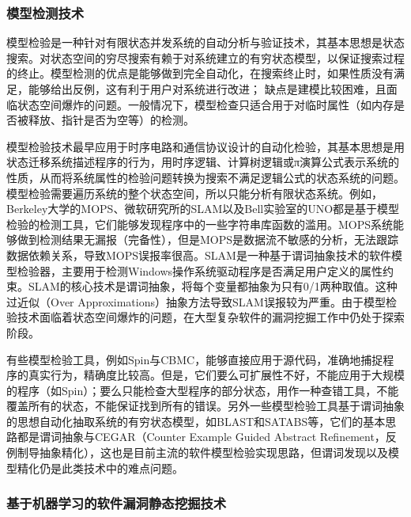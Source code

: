 \subsubsection{模型检测技术}

模型检验是一种针对有限状态并发系统的自动分析与验证技术，其基本思想是状态搜索。对状态空间的穷尽搜索有赖于对系统建立的有穷状态模型，以保证搜索过程的终止。模型检测的优点是能够做到完全自动化，在搜索终止时，如果性质没有满足，能够给出反例，这有利于用户对系统进行改进； 缺点是建模比较困难，且面临状态空间爆炸的问题。一般情况下，模型检查只适合用于对临时属性（如内存是否被释放、指针是否为空等）的检测。

模型检验技术最早应用于时序电路和通信协议设计的自动化检验，其基本思想是用状态迁移系统描述程序的行为，用时序逻辑、计算树逻辑或π演算公式表示系统的性质，从而将系统属性的检验问题转换为搜索不满足逻辑公式的状态系统的问题。模型检验需要遍历系统的整个状态空间，所以只能分析有限状态系统。例如，Berkeley大学的MOPS、微软研究所的SLAM以及Bell实验室的UNO都是基于模型检验的检测工具，它们能够发现程序中的一些字符串库函数的滥用。MOPS系统能够做到检测结果无漏报（完备性），但是MOPS是数据流不敏感的分析，无法跟踪数据依赖关系，导致MOPS误报率很高。SLAM是一种基于谓词抽象技术的软件模型检验器，主要用于检测Windows操作系统驱动程序是否满足用户定义的属性约束。SLAM的核心技术是谓词抽象，将每个变量都抽象为只有0/1两种取值。这种过近似（Over Approximations）抽象方法导致SLAM误报较为严重。由于模型检验技术面临着状态空间爆炸的问题，在大型复杂软件的漏洞挖掘工作中仍处于探索阶段。

有些模型检验工具，例如Spin与CBMC，能够直接应用于源代码，准确地捕捉程序的真实行为，精确度比较高。但是，它们要么可扩展性不好，不能应用于大规模的程序（如Spin）；要么只能检查大型程序的部分状态，用作一种查错工具，不能覆盖所有的状态，不能保证找到所有的错误。另外一些模型检验工具基于谓词抽象的思想自动化抽取系统的有穷状态模型，如BLAST和SATABS等，它们的基本思路都是谓词抽象与CEGAR（Counter Example Guided Abstract Refinement，反例制导抽象精化），这也是目前主流的软件模型检验实现思路，但谓词发现以及模型精化仍是此类技术中的难点问题。


\subsubsection{基于机器学习的软件漏洞静态挖掘技术}

